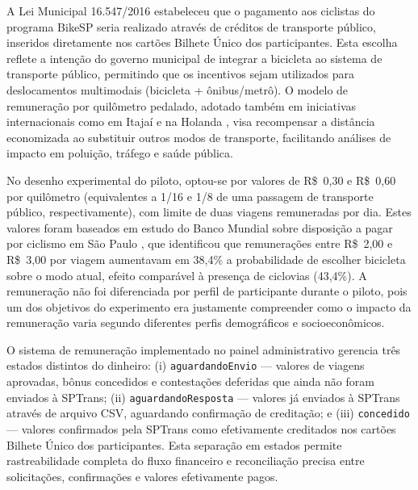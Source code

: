 

A Lei Municipal 16.547/2016 estabeleceu
que o pagamento aos ciclistas do programa BikeSP seria realizado através de créditos
de transporte público, inseridos diretamente nos cartões Bilhete Único dos
participantes. Esta escolha reflete a intenção do governo municipal de integrar a
bicicleta ao sistema de transporte público, permitindo que os incentivos sejam
utilizados para deslocamentos multimodais (bicicleta + ônibus/metrô). O modelo de
remuneração por quilômetro pedalado, adotado também em iniciativas internacionais
como em Itajaí e na Holanda \citep{itajai2021, tennant2022}, visa recompensar a distância economizada ao
substituir outros modos de transporte, facilitando análises de impacto em poluição,
tráfego e saúde pública.

No desenho experimental do piloto, optou-se por valores de R\$~0,30 e R\$~0,60 por
quilômetro (equivalentes a 1/16 e 1/8 de uma passagem de transporte público,
respectivamente), com limite de duas viagens remuneradas por dia. Estes valores foram
baseados em estudo do Banco Mundial sobre disposição a pagar por ciclismo em São
Paulo \citep{worldbank2022}, que identificou que remunerações entre R\$~2,00 e R\$~3,00 por viagem
aumentavam em 38,4\% a probabilidade de escolher bicicleta sobre o modo atual,
efeito comparável à presença de ciclovias (43,4\%). A remuneração não foi
diferenciada por perfil de participante durante o piloto, pois um dos objetivos do
experimento era justamente compreender como o impacto da remuneração varia
segundo diferentes perfis demográficos e socioeconômicos.

O sistema de remuneração implementado no
painel administrativo gerencia três estados distintos do dinheiro: (i)
\texttt{aguardandoEnvio} --- valores de viagens aprovadas, bônus concedidos e
contestações deferidas que ainda não foram enviados à SPTrans; (ii)
\texttt{aguardandoResposta} --- valores já enviados à SPTrans através de arquivo
CSV, aguardando confirmação de creditação; e (iii) \texttt{concedido} --- valores
confirmados pela SPTrans como efetivamente creditados nos cartões Bilhete Único dos
participantes. Esta separação em estados permite rastreabilidade completa do fluxo
financeiro e reconciliação precisa entre solicitações, confirmações e valores
efetivamente pagos.

